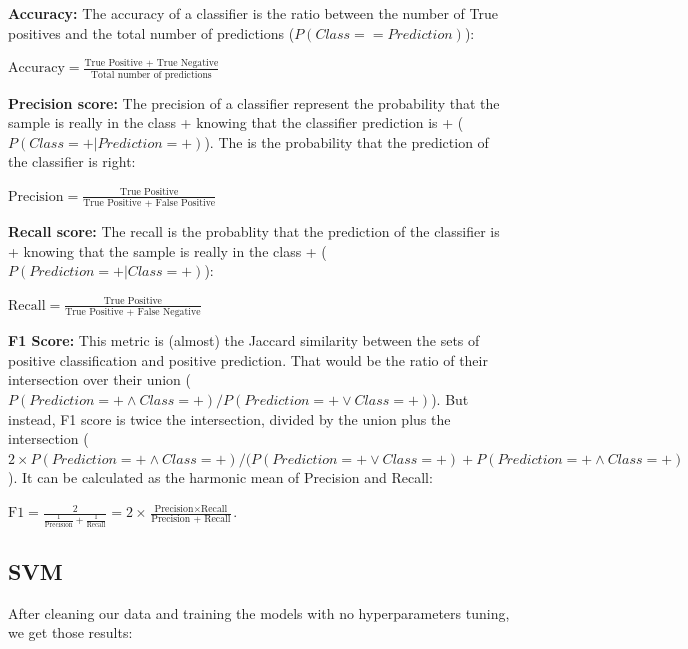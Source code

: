 \documentclass[twocolumn]{article}
\begin{document}
\textbf{Accuracy:} The accuracy of a classifier is the ratio between the number of True positives and the total number of predictions ($P(Class == Prediction)$): 

\(\displaystyle \text{Accuracy} = \frac{\text{True Positive + True Negative}}{\text{Total number of predictions}} \)

\textbf{Precision score:} The precision of a classifier represent the probability that the sample is really in the class + knowing that the classifier prediction is + ($P(Class=+ | Prediction = +)$). The is the probability that the prediction of the classifier is right:

\(\displaystyle \text{Precision} = \frac{\text{True Positive}}{\text{True Positive + False Positive}}\)

\textbf{Recall score:} The recall is the probablity that the prediction of the classifier is + knowing that the sample is really in the class + ($P(Prediction=+ | Class = +)$):

\(\displaystyle \text{Recall} = \frac{\text{True Positive}}{\text{True Positive + False Negative}}\)


\textbf{F1 Score:} This metric is (almost) the Jaccard similarity between the sets of positive classification and positive prediction. That would be the ratio of their intersection over their union  ($P(Prediction=+ \land Class = +)/P(Prediction=+ \lor Class = +)$). But instead, F1 score is twice the intersection, divided by the union plus the intersection ($2 \times P(Prediction=+ \land Class = +)/(P(Prediction=+ \lor Class = +) +  P(Prediction=+ \land Class = +)$). It can be calculated as the harmonic mean of Precision and Recall:

\(\displaystyle \text{F1} = \frac{2}{\frac{1}{\text{Precision}} + \frac{1}{\text{Recall}}} \displaystyle = 2 \times \frac{\text{Precision}\times\text{Recall}}{\text{Precision + Recall}} \). 

\subsection{SVM}
After cleaning our data and training the models with no hyperparameters tuning, we get those results:
\end{document}
